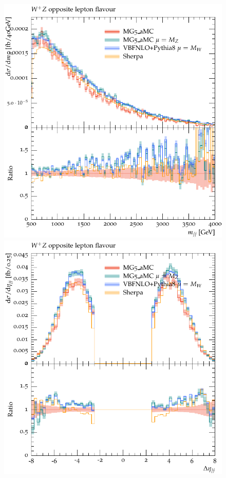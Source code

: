 \begin{figure}[htbp]
\begin{center}
   \includegraphics[scale=0.65]{figs/WpZ_OF_mjj}
   \includegraphics[scale=0.65]{figs/WpZ_OF_dEtajj}

\end{center}
\end{figure}
